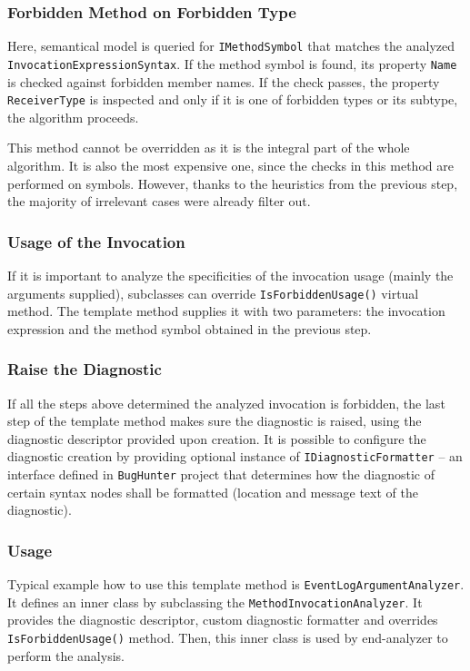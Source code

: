 \documentclass[
  digital, %
  table,   %
  lof,     %
  lot,     %
  oneside,
]{fithesis3}
\begin{document}

\subsubsection{Forbidden Method on Forbidden Type}
Here, semantical model is queried for \texttt{IMethodSymbol} that matches the analyzed \texttt{InvocationExpressionSyntax}. If the method symbol is found, its property \texttt{Name} is checked against forbidden member names. If the check passes, the property \texttt{ReceiverType} is inspected and only if it is one of forbidden types or its subtype, the algorithm proceeds. 

This method cannot be overridden as it is the integral part of the whole algorithm. It is also the most expensive one, since the checks in this method are performed on symbols. However, thanks to the heuristics from the previous step, the majority of irrelevant cases were already filter out.

\subsubsection{Usage of the Invocation}
If it is important to analyze the specificities of the invocation usage (mainly the arguments supplied), subclasses can override \texttt{IsForbiddenUsage()} virtual method. The template method supplies it with two parameters: the invocation expression and the method symbol obtained in the previous step.

\subsubsection{Raise the Diagnostic}
If all the steps above determined the analyzed invocation is forbidden, the last step of the template method makes sure the diagnostic is raised, using the diagnostic descriptor provided upon creation. It is possible to configure the diagnostic creation by providing optional instance of \texttt{IDiagnosticFormatter} -- an interface defined in \texttt{BugHunter} project that determines how the diagnostic of certain syntax nodes shall be formatted (location and message text of the diagnostic).

\subsubsection{Usage}
Typical example how to use this template method is \texttt{EventLogArgumentAnalyzer}. It defines an inner class by subclassing the \texttt{MethodInvocationAnalyzer}. It provides the diagnostic descriptor, custom diagnostic formatter and overrides \texttt{IsForbiddenUsage()} method. Then, this inner class is used by end-analyzer to perform the analysis.
\end{document}
